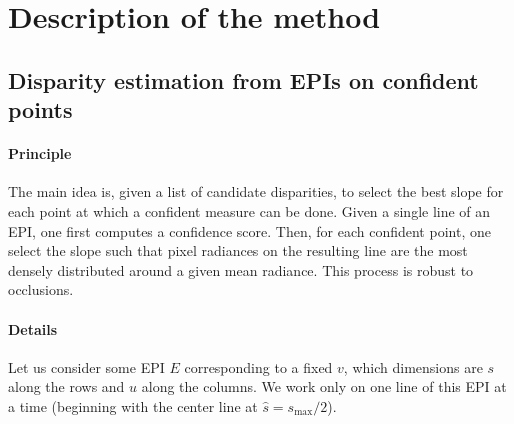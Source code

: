 \documentclass{article}
\theoremstyle{definition}
\begin{document}
\section{Description of the method}


\subsection{Disparity estimation from EPIs on confident points}


\paragraph{Principle} The main idea is, given a list of candidate disparities, to select the best slope for each point at which a confident measure can be done. Given a single line of an EPI, one first computes a confidence score. Then, for each confident point, one select the slope such that pixel radiances on the resulting line are the most densely distributed around a given mean radiance. This process is robust to occlusions.


\paragraph{Details} Let us consider some EPI $E$ corresponding to a fixed $v$, which dimensions are $s$ along the rows and $u$ along the columns. We work only on one line of this EPI at a time (beginning with the center line at $\widehat{s} = s_{\max} / 2$).
\end{document}
